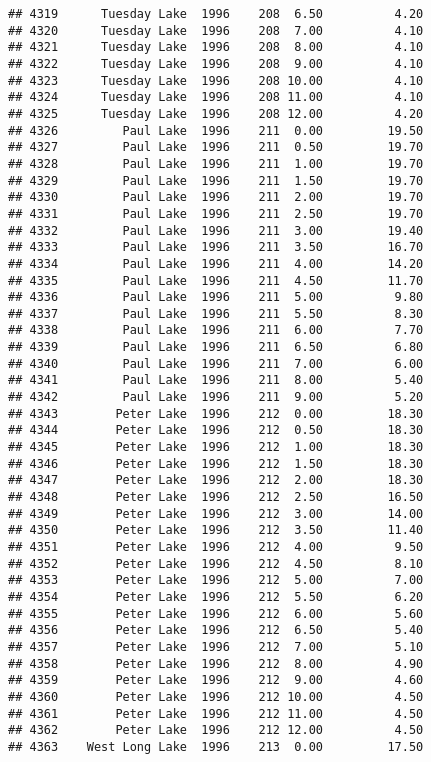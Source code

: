 \documentclass[
]{article}
\begin{document}
\begin{verbatim}
## 4319      Tuesday Lake  1996    208  6.50          4.20
## 4320      Tuesday Lake  1996    208  7.00          4.10
## 4321      Tuesday Lake  1996    208  8.00          4.10
## 4322      Tuesday Lake  1996    208  9.00          4.10
## 4323      Tuesday Lake  1996    208 10.00          4.10
## 4324      Tuesday Lake  1996    208 11.00          4.10
## 4325      Tuesday Lake  1996    208 12.00          4.20
## 4326         Paul Lake  1996    211  0.00         19.50
## 4327         Paul Lake  1996    211  0.50         19.70
## 4328         Paul Lake  1996    211  1.00         19.70
## 4329         Paul Lake  1996    211  1.50         19.70
## 4330         Paul Lake  1996    211  2.00         19.70
## 4331         Paul Lake  1996    211  2.50         19.70
## 4332         Paul Lake  1996    211  3.00         19.40
## 4333         Paul Lake  1996    211  3.50         16.70
## 4334         Paul Lake  1996    211  4.00         14.20
## 4335         Paul Lake  1996    211  4.50         11.70
## 4336         Paul Lake  1996    211  5.00          9.80
## 4337         Paul Lake  1996    211  5.50          8.30
## 4338         Paul Lake  1996    211  6.00          7.70
## 4339         Paul Lake  1996    211  6.50          6.80
## 4340         Paul Lake  1996    211  7.00          6.00
## 4341         Paul Lake  1996    211  8.00          5.40
## 4342         Paul Lake  1996    211  9.00          5.20
## 4343        Peter Lake  1996    212  0.00         18.30
## 4344        Peter Lake  1996    212  0.50         18.30
## 4345        Peter Lake  1996    212  1.00         18.30
## 4346        Peter Lake  1996    212  1.50         18.30
## 4347        Peter Lake  1996    212  2.00         18.30
## 4348        Peter Lake  1996    212  2.50         16.50
## 4349        Peter Lake  1996    212  3.00         14.00
## 4350        Peter Lake  1996    212  3.50         11.40
## 4351        Peter Lake  1996    212  4.00          9.50
## 4352        Peter Lake  1996    212  4.50          8.10
## 4353        Peter Lake  1996    212  5.00          7.00
## 4354        Peter Lake  1996    212  5.50          6.20
## 4355        Peter Lake  1996    212  6.00          5.60
## 4356        Peter Lake  1996    212  6.50          5.40
## 4357        Peter Lake  1996    212  7.00          5.10
## 4358        Peter Lake  1996    212  8.00          4.90
## 4359        Peter Lake  1996    212  9.00          4.60
## 4360        Peter Lake  1996    212 10.00          4.50
## 4361        Peter Lake  1996    212 11.00          4.50
## 4362        Peter Lake  1996    212 12.00          4.50
## 4363    West Long Lake  1996    213  0.00         17.50

\end{verbatim}
\end{document}
